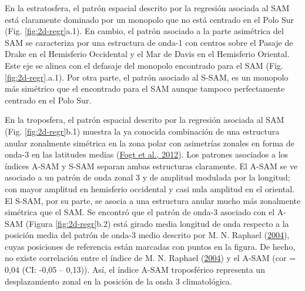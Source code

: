 \documentclass[12pt,oneside,a4paper]{reedthesis}
\begin{document}
En la estratosfera, el patrón espacial descrito por la regresión asociada al SAM está claramente dominado por un monopolo que no está centrado en el Polo Sur (Fig. \ref{fig:2d-regr}a.1).
En cambio, el patrón asociado a la parte asimétrica del SAM se caracteriza por una estructura de onda-1 con centros sobre el Pasaje de Drake en el Hemisferio Occidental y el Mar de Davis en el Hemisferio Oriental.
Este eje se alinea con el defasaje del monopolo encontrado para el SAM (Fig. \ref{fig:2d-regr}.a.1).
Por otra parte, el patrón asociado al S-SAM, es un monopolo más simétrico que el encontrado para el SAM aunque tampoco perfectamente centrado en el Polo Sur.

En la troposfera, el patrón espacial descrito por la regresión asociada al SAM (Fig. \ref{fig:2d-regr}b.1) muestra la ya conocida combinación de una estructura anular zonalmente simétrica en la zona polar con asimetrías zonales en forma de onda-3 en las latitudes medias (\protect\hyperlink{ref-fogt2012}{Fogt et al., 2012}).
Los patrones asociados a los índices A-SAM y S-SAM separan ambas estructuras claramente.
El A-SAM se ve asociado a un patrón de onda zonal 3 y de amplitud modulada por la longitud; con mayor amplitud en hemisferio occidental y casi nula amplitud en el oriental.
El S-SAM, por su parte, se asocia a una estructura anular mucho más zonalmente simétrica que el SAM.
Se encontró que el patrón de onda-3 asociado con el A-SAM (Figura \ref{fig:2d-regr}b.2) está girado media longitud de onda respecto a la posición media del patrón de onda-3 medio descrito por M. N. Raphael (\protect\hyperlink{ref-raphael2004}{2004}), cuyas posiciones de referencia están marcadas con puntos en la figura.
De hecho, no existe correlación entre el índice de M. N. Raphael (\protect\hyperlink{ref-raphael2004}{2004}) y el A-SAM (cor = 0,04 (CI: -0,05 -- 0,13)).
Así, el índice A-SAM troposférico representa un desplazamiento zonal en la posición de la onda 3 climatológica.
\end{document}
